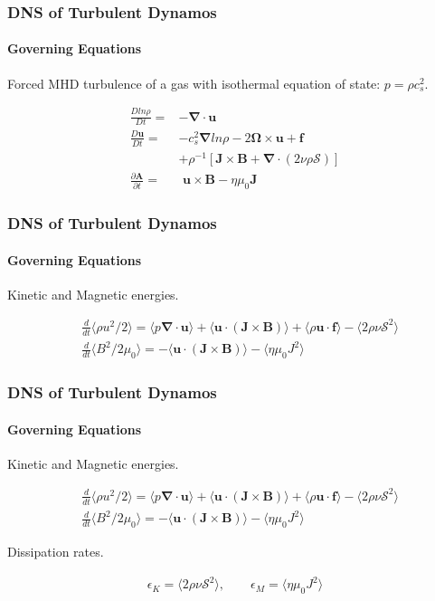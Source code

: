\documentclass{beamer}
\begin{document}
\begin{frame}
 \frametitle{DNS of Turbulent Dynamos}
 \framesubtitle{Governing Equations}
 
 Forced MHD turbulence of a gas with isothermal equation of state: $p=\rho c_s^2$.
 
 \begin{align}
  \frac{D ln \rho}{Dt} =& - \bm{\nabla} \cdot \bm{u} \nonumber \\
  \frac{D \bm{u}}{Dt} =& -c_s^2 \bm{\nabla} ln \rho - 2 \bm{\Omega} \times \bm{u} + \bm{f} \nonumber \\
  & + \rho^{-1} [\bm{J} \times \bm{B} + \bm{\nabla} \cdot (2\nu \rho \bm{\mathcal{S}})] \nonumber \\
  \frac{\partial \bm{A}}{\partial t} =&\,\, \bm{u} \times \bm{B} - \eta \mu_0 \bm{J} \nonumber
 \end{align}

\end{frame}

\begin{frame}
 \frametitle{DNS of Turbulent Dynamos}
 \framesubtitle{Governing Equations}
 
 Kinetic and Magnetic energies.

\begin{align}
  &\frac{d}{dt} \langle \rho u^2 /2 \rangle = \langle p \bm{\nabla \cdot u} \rangle + \langle \bm{u} \cdot (\bm{J} \times \bm{B}) \rangle  + \langle \rho \bm{u \cdot f} \rangle - \langle 2\rho \nu \mathcal{S}^2 \rangle \nonumber \\
  &\frac{d}{dt} \langle B^2 / 2\mu_0 \rangle = - \langle \bm{u} \cdot (\bm{J} \times \bm{B}) \rangle - \langle \eta \mu_0 J^2 \rangle \nonumber
 \end{align}

\end{frame}

\begin{frame}
 \frametitle{DNS of Turbulent Dynamos}
 \framesubtitle{Governing Equations}
 
 Kinetic and Magnetic energies.

 \begin{align}
  &\frac{d}{dt} \langle \rho u^2 /2 \rangle = \langle p \bm{\nabla \cdot u} \rangle + \langle \bm{u} \cdot (\bm{J} \times \bm{B}) \rangle  + \langle \rho \bm{u \cdot f}\rangle - \langle 2\rho \nu \mathcal{S}^2 \rangle  \nonumber \\
  &\frac{d}{dt} \langle B^2 / 2\mu_0 \rangle = - \langle \bm{u} \cdot (\bm{J} \times \bm{B}) \rangle - \langle \eta \mu_0 J^2 \rangle \nonumber
 \end{align}
 
 Dissipation rates.
 
 \begin{align}
  \epsilon_K = \langle 2 \rho \nu \mathcal{S}^2 \rangle, \qquad \epsilon_M = \langle \eta \mu_0 J^2 \rangle \nonumber
 \end{align}



\end{frame}
\end{document}
